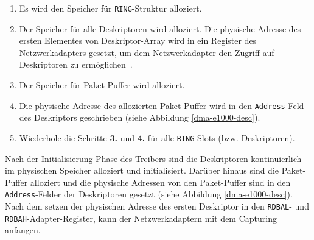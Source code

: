 \begin{enumerate}
	\item Es wird den Speicher für \verb+RING+-Struktur alloziert.
	\item Der Speicher für alle Deskriptoren wird alloziert. Die physische
		Adresse des ersten Elementes von Deskriptor-Array wird in ein Register
		des Netzwerkadapters gesetzt, um dem Netzwerkadapter den Zugriff auf
		Deskriptoren zu ermöglichen~\cite{e1000_sdm}.
	\item Der Speicher für Paket-Puffer wird alloziert.
	\item Die physische Adresse des allozierten Paket-Puffer wird in den 
		\verb+Address+-Feld des Deskriptors geschrieben (siehe Abbildung
		\ref{dma-e1000-desc}). 
	\item Wiederhole die Schritte \textbf{3.} und \textbf{4.} für alle 
		\verb+RING+-Slots (bzw. Deskriptoren).
\end{enumerate}
Nach der Initialisierung-Phase des Treibers sind die Deskriptoren
kontinuierlich  im physischen Speicher alloziert und initialisiert. Darüber
hinaus sind die Paket-Puffer alloziert und die physische Adressen von den
Paket-Puffer sind in den \verb+Address+-Felder der Deskriptoren gesetzt (siehe
Abbildung \ref{dma-e1000-desc}). Nach dem setzen der physischen Adresse des 
ersten Deskriptor in den \verb+RDBAL+- und \verb+RDBAH+-Adapter-Register, 
kann der Netzwerkadaptern mit dem Capturing anfangen.

